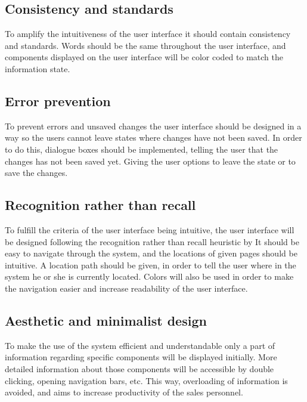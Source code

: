 \subsection{Consistency and standards}
To amplify the intuitiveness of the user interface it should contain consistency and standards. Words should be the same throughout the user interface, and components displayed on the user interface will be color coded to match the information state. 

\subsection{Error prevention}
To prevent errors and unsaved changes the user interface should be designed in a way so the users cannot leave states where changes have not been saved. In order to do this, dialogue boxes should be implemented, telling the user that the changes has not been saved yet. Giving the user options to leave the state or to save the changes. 

\subsection{Recognition rather than recall}
To fulfill the criteria of the user interface being intuitive, the user interface will be designed following the recognition rather than recall heuristic by It should be easy to navigate through the system, and the locations of given pages should be intuitive. A location path should be given, in order to tell the user where in the system he or she is currently located. Colors will also be used in order to make the navigation easier and increase readability of the user interface.

\subsection{Aesthetic and minimalist design}
To make the use of the system efficient and understandable only a part of information regarding specific components will be displayed initially. More detailed information about those components will be accessible by double clicking, opening navigation bars, etc. This way, overloading of information is avoided, and aims to increase productivity of the sales personnel. 

